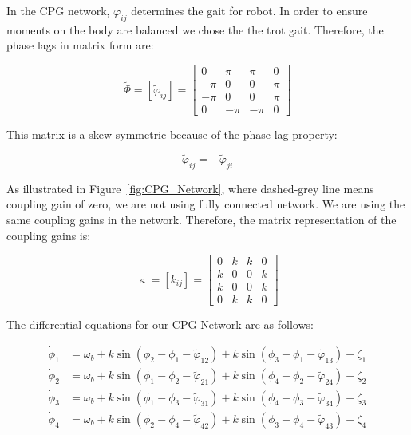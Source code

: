 \documentclass{article}
\begin{document}
In the CPG network, $\varphi_{ij}$ determines the gait for robot. In order to ensure moments on the body are balanced we chose the the trot gait. Therefore, the phase lags in matrix form are:

\begin{equation}
	\tilde{\Phi} = [\tilde{\varphi}_{ij}]=\left[ \begin{array}{rrrr}
	0    & \pi & \pi  & 0   \\
	-\pi & 0   & 0    & \pi  \\
	-\pi & 0   & 0    & \pi   \\
	0    & -\pi&-\pi  & 0 
	\end{array} \right]
\end{equation}
	
This matrix is a skew-symmetric because of the phase lag property:

\begin{equation}
	\tilde{\varphi}_{ij} = - \tilde{\varphi}_{ji}
\end{equation}

As illustrated in Figure~\ref{fig:CPG_Network}, where dashed-grey line means coupling gain of zero, we are not using fully connected network.  We are using the same coupling gains in the network. Therefore, the matrix representation of the coupling gains is:
 
\begin{equation}
	\upkappa = [k_{ij}]=\left[ \begin{array}{rrrr}
	0 & k & k & 0  \\
	k & 0 & 0 & k  \\
	k & 0 & 0 & k  \\
	0 & k & k & 0 
	\end{array} \right]
\end{equation}

The differential equations for our CPG-Network are as follows:

\begin{align}\label{eq:cpg_net}
	\dot\phi_1&=\omega_{b} + k\sin \left(\phi_2-\phi_1-\tilde{\varphi}_{12}\right)+k\sin\left(\phi_3-\phi_1-\tilde{\varphi}_{13}\right)+ \zeta_1\\
 	\dot\phi_2&=\omega_{b} + k\sin \left(\phi_1-\phi_2-\tilde{\varphi}_{21}\right)+k\sin\left(\phi_4-\phi_2-\tilde{\varphi}_{24}\right)+ \zeta_2\\
 	\dot\phi_3&=\omega_{b} + k\sin \left(\phi_1-\phi_3-\tilde{\varphi}_{31}\right)+k\sin\left(\phi_4-\phi_3-\tilde{\varphi}_{34}\right)+ \zeta_3\\
	\dot\phi_4&=\omega_{b} + k\sin \left(\phi_2-\phi_4-\tilde{\varphi}_{42}\right)+k\sin\left(\phi_3-\phi_4-\tilde{\varphi}_{43}\right)+ \zeta_4
\end{align}
\end{document}
